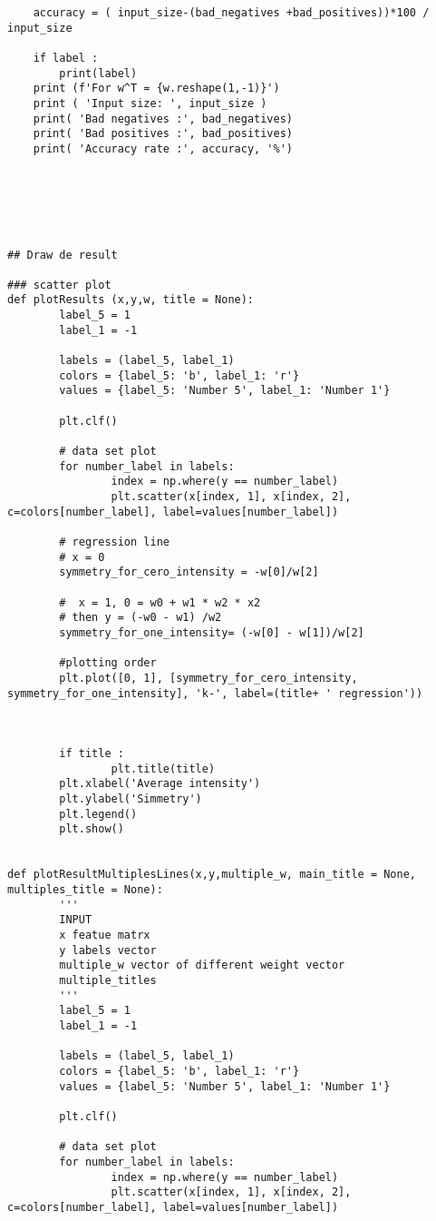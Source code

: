 \begin{verbatim}
    accuracy = ( input_size-(bad_negatives +bad_positives))*100 / input_size

    if label :
        print(label)
    print (f'For w^T = {w.reshape(1,-1)}')
    print ( 'Input size: ', input_size )    
    print( 'Bad negatives :', bad_negatives)
    print( 'Bad positives :', bad_positives)
    print( 'Accuracy rate :', accuracy, '%')





    
## Draw de result

### scatter plot
def plotResults (x,y,w, title = None):
        label_5 = 1
        label_1 = -1

        labels = (label_5, label_1)
        colors = {label_5: 'b', label_1: 'r'}
        values = {label_5: 'Number 5', label_1: 'Number 1'}

        plt.clf()

        # data set plot 
        for number_label in labels:
                index = np.where(y == number_label)
                plt.scatter(x[index, 1], x[index, 2], c=colors[number_label], label=values[number_label])

        # regression line
        # x = 0
        symmetry_for_cero_intensity = -w[0]/w[2]

        #  x = 1, 0 = w0 + w1 * w2 * x2
        # then y = (-w0 - w1) /w2
        symmetry_for_one_intensity= (-w[0] - w[1])/w[2]

        #plotting order
        plt.plot([0, 1], [symmetry_for_cero_intensity, symmetry_for_one_intensity], 'k-', label=(title+ ' regression'))

                

        if title :
                plt.title(title)
        plt.xlabel('Average intensity')
        plt.ylabel('Simmetry')
        plt.legend()
        plt.show()
        

def plotResultMultiplesLines(x,y,multiple_w, main_title = None, multiples_title = None):
        '''
        INPUT 
        x featue matrx
        y labels vector 
        multiple_w vector of different weight vector
        multiple_titles
        '''
        label_5 = 1
        label_1 = -1

        labels = (label_5, label_1)
        colors = {label_5: 'b', label_1: 'r'}
        values = {label_5: 'Number 5', label_1: 'Number 1'}

        plt.clf()

        # data set plot 
        for number_label in labels:
                index = np.where(y == number_label)
                plt.scatter(x[index, 1], x[index, 2], c=colors[number_label], label=values[number_label])


\end{verbatim}
